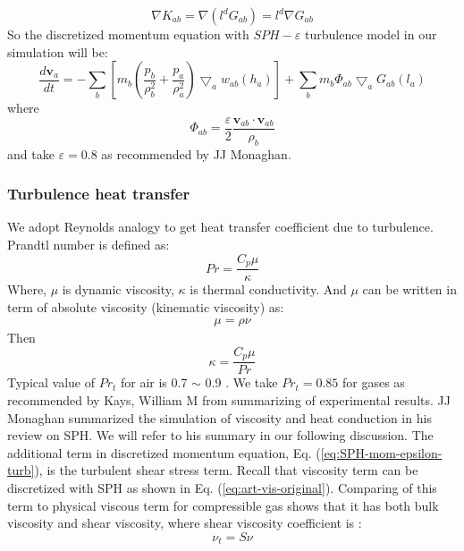 \documentclass[journal abbreviation, manuscript]{copernicus}
\begin{document}
\begin{equation}
\nabla K_{ab} = \nabla (l^d G_{ab}) = l^d \nabla G_{ab}
\end{equation}
So the discretized momentum equation with $SPH-\varepsilon$ turbulence model in our simulation will be:
\begin{equation}
\label{eq:SPH-mom-epsilon-turb}
\dfrac{d \textbf{v}_a}{dt} = -\sum_b [m_b (\dfrac{p_b}{\rho_b^2} + \dfrac{p_a}{\rho_a^2}) \bigtriangledown_aw_{a b}(h_a)] + \sum_b m_b \Phi_{ab}\bigtriangledown_aG_{ab}(l_a)
\end{equation}
where 
\begin{equation}
\Phi_{ab}=\dfrac{\varepsilon}{2} \dfrac{\textbf{v}_{ab} \cdot \textbf{v}_{ab}}{\rho_b} 
\end{equation}
and take $\varepsilon = 0.8$ as recommended by JJ Monaghan.
\subsubsection{Turbulence heat transfer}
We adopt Reynolds analogy to get heat transfer coefficient due to turbulence.
Prandtl number is defined as:
\begin{equation}
Pr=\dfrac{C_p \mu}{\kappa}
\end{equation}
Where, $\mu$ is dynamic viscosity, $\kappa$ is thermal conductivity. And $\mu$  can be written in term of absolute viscosity (kinematic viscosity) as:
\begin{align}
\mu=\rho \nu
\end{align}
Then
\begin{equation}
\kappa=\dfrac{C_p \mu}{Pr}
\end{equation}
Typical value of $Pr_t$ for air is 0.7 $\sim$ 0.9 . We take $Pr_t=0.85$ for gases as recommended by Kays, William M \citep{kays1994turbulent} from summarizing of experimental results. 
JJ Monaghan \citep{monaghan2005smoothed} summarized the simulation of viscosity and heat conduction in his review on SPH. We will refer to his summary in our following discussion. The additional term in discretized momentum equation, Eq. (\ref{eq:SPH-mom-epsilon-turb}), is the turbulent shear stress term. 
Recall that viscosity term can be discretized with SPH as shown in Eq. (\ref{eq:art-vis-original}). 
Comparing of this term to physical viscous term for compressible gas shows that it has both bulk viscosity and shear viscosity, where shear viscosity coefficient is \citep{monaghan2005smoothed}:\\
\begin{equation}
\nu_t = S \nu
\end{equation}
\end{document}
